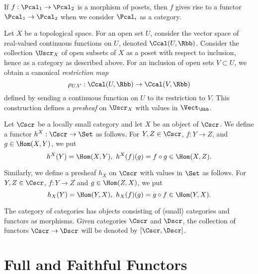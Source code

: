 \begin{example}
  If $f : \Pcal_{1} \to \Pcal_{2}$ is a morphism of posets, then $f$ gives rise to a functor $\Pcal_{1} \to \Pcal_{2}$ when we consider $\Pcal_{i}$ as a category.
\end{example}

\begin{example}
  Let $X$ be a topological space.
  For an open set $U$, consider the vector space of real-valued continuous functions on $U$, denoted $\Ccal(U,\Rbb)$.
  Consider the collection $\Uscr_{X}$ of open subsets of $X$ as a poset with respect to inclusion, hence as a category as described above.
  For an inclusion of open sets $V \subset U$, we obtain a canonical \emph{restriction map}
  \[ \rho_{U,V}: \Ccal(U,\Rbb) \to \Ccal(V,\Rbb) \]
  defined by sending a continuous function on $U$ to its restriction to $V$.
  This construction defines a \emph{presheaf} on $\Uscr_{X}$ with values in $\Vect_{\Rbb}$.
\end{example}

\begin{example}
  Let $\Cscr$ be a locally small category and let $X$ be an object of $\Cscr$.
  We define a functor $h^{X} : \Cscr \to \Set$ as follows.
  For $Y, Z \in \Cscr$, $f : Y \to Z$, and $g \in \Hom(X,Y)$, we put
  \[ h^{X}(Y) = \Hom(X,Y), \ h^{X}(f)(g) = f \circ g \in \Hom(X,Z). \]

  Similarly, we define a presheaf $h_{X}$ on $\Cscr$ with values in $\Set$ as follows.
  For $Y,Z \in \Cscr$, $f : Y \to Z$ and $g \in \Hom(Z,X)$, we put
  \[ h_{X}(Y) = \Hom(Y,X), \ h_{X}(f)(g) = g \circ f \in \Hom(Y,X). \]
\end{example}

\begin{example}
  The category of categories has objects consisting of (small) categories and functors as morphisms.
  Given categories $\Cscr$ and $\Dscr$, the collection of functors $\Cscr \to \Dscr$ will be denoted by $[\Cscr,\Dscr]$.
\end{example}

\section{Full and Faithful Functors}

